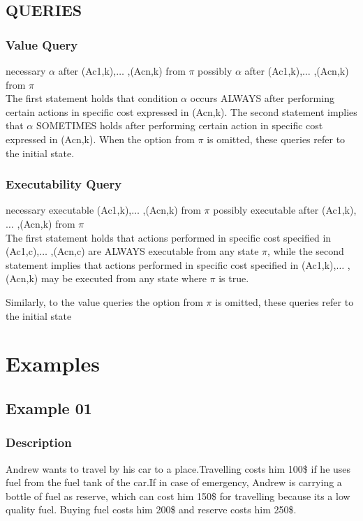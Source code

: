 \documentclass[11pt]{article}
\begin{document}
	\subsection{QUERIES}
	\subsubsection{Value Query}
	necessary $ \alpha $  after (Ac1,k),$ \ldots $ ,(Acn,k) from $\pi$
	possibly $ \alpha $  after (Ac1,k),$ \ldots $ ,(Acn,k) from $\pi$\\
	The first statement holds that condition $ \alpha $  occurs ALWAYS after performing certain actions in specific cost expressed in (Acn,k). The second statement implies that $ \alpha $  SOMETIMES holds after performing certain action in specific cost expressed in (Acn,k). When the option from $\pi$ is omitted, these queries refer to the initial state.\par
	\subsubsection{Executability Query}
	necessary executable (Ac1,k),$ \ldots $ ,(Acn,k) from $\pi$
	possibly executable after (Ac1,k),$ \ldots $ ,(Acn,k) from $\pi$\\
	The first statement holds that actions performed in specific cost specified in (Ac1,c),$ \ldots $ ,(Acn,c) are ALWAYS executable from any state $\pi$, while the second statement implies that actions performed in specific cost specified in (Ac1,k),$ \ldots $ ,(Acn,k) may be executed from any state where $\pi$ is true.\par
	Similarly, to the value queries the option from $\pi$ is omitted, these queries refer to the initial state\par
	\section{Examples}\label{sec:Examples}
	\subsection{Example 01}\label{example:ex01}
	\subsubsection{Description}\label{par:p101}
	Andrew wants to travel by his car to a place.Travelling costs him 100\$ if he uses fuel from the fuel tank of the car.If in case of emergency, Andrew is carrying a bottle of fuel as reserve, which can cost him 150\$ for travelling because its a low quality fuel. Buying fuel costs him 200\$ and reserve costs him 250\$.\\
\end{document}
